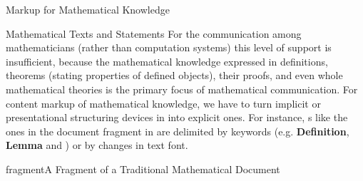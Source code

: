 \begin{omgroup}[id=math-markup]{Markup for Mathematical Knowledge}
\begin{omgroup}[id=meta-math]{Mathematical Texts and Statements}
  For the communication among mathematicians (rather than computation systems) this level
  of support is insufficient, because the mathematical knowledge expressed in definitions,
  theorems (stating properties of defined objects), their proofs, and even whole
  mathematical theories is the primary focus of mathematical communication. For content
  markup of mathematical knowledge, we have to turn implicit or presentational structuring
  devices in  into explicit
  ones. For instance, {s} like the ones in the document
  fragment in {} are delimited by keywords (e.g. {\textbf{Definition}},
  {\textbf{Lemma}} and {\boexchen}) or by changes in text font.

\begin{myfig}{fragment}{A Fragment of a Traditional Mathematical Document}
\end{myfig}
\end{omgroup}
\end{omgroup}
